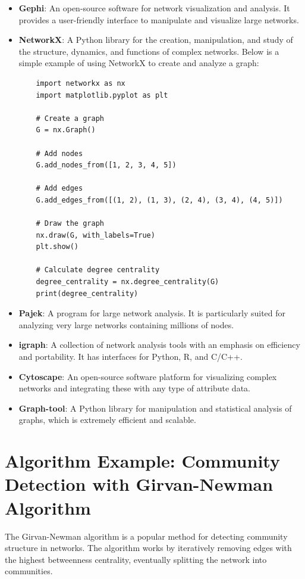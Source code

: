 \documentclass[12pt]{book} %
\begin{document}
\begin{itemize}
    \item \textbf{Gephi}: An open-source software for network visualization and analysis. It provides a user-friendly interface to manipulate and visualize large networks.
    \item \textbf{NetworkX}: A Python library for the creation, manipulation, and study of the structure, dynamics, and functions of complex networks. Below is a simple example of using NetworkX to create and analyze a graph:
    
    \begin{lstlisting}
    import networkx as nx
    import matplotlib.pyplot as plt
    
    # Create a graph
    G = nx.Graph()
    
    # Add nodes
    G.add_nodes_from([1, 2, 3, 4, 5])
    
    # Add edges
    G.add_edges_from([(1, 2), (1, 3), (2, 4), (3, 4), (4, 5)])
    
    # Draw the graph
    nx.draw(G, with_labels=True)
    plt.show()
    
    # Calculate degree centrality
    degree_centrality = nx.degree_centrality(G)
    print(degree_centrality)
    \end{lstlisting}
    
    \item \textbf{Pajek}: A program for large network analysis. It is particularly suited for analyzing very large networks containing millions of nodes.
    \item \textbf{igraph}: A collection of network analysis tools with an emphasis on efficiency and portability. It has interfaces for Python, R, and C/C++.
    \item \textbf{Cytoscape}: An open-source software platform for visualizing complex networks and integrating these with any type of attribute data.
    \item \textbf{Graph-tool}: A Python library for manipulation and statistical analysis of graphs, which is extremely efficient and scalable.
\end{itemize}

\section*{Algorithm Example: Community Detection with Girvan-Newman Algorithm}
The Girvan-Newman algorithm is a popular method for detecting community structure in networks. The algorithm works by iteratively removing edges with the highest betweenness centrality, eventually splitting the network into communities.
\end{document}
